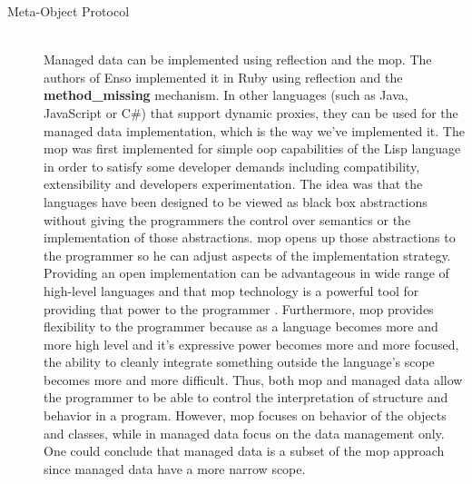 \begin{description}

  \item[Meta-Object Protocol]~\\
  Managed data can be implemented using reflection and the \ac{mop}. 
  The authors of Enso \cite{loh2012managed} implemented it in Ruby using reflection and the \textbf{method\_missing} mechanism. 
  In other languages (such as Java, JavaScript or C\#) that support dynamic proxies, they can be used for the managed data implementation, which is the way we've implemented it.
  The \ac{mop} \cite{kiczales1991art} was first implemented for simple \ac{oop} capabilities of the Lisp language in order to satisfy some developer demands including compatibility, extensibility and developers experimentation. 
  The idea was that the languages have been designed to be viewed as black box abstractions without giving the programmers the control over semantics or the implementation of those abstractions. 
  \ac{mop} opens up those abstractions to the programmer so he can adjust aspects of the implementation strategy. 
  Providing an open implementation can be advantageous in wide range of high-level languages and that \ac{mop} technology is a powerful tool for providing that power to the programmer \cite{kiczales1991art}. 
  Furthermore, \ac{mop} provides flexibility to the programmer because as a language becomes more and more high level and it's expressive power becomes more and more focused, the ability to cleanly integrate something outside the language's scope becomes more and more difficult. 
  Thus, both \ac{mop} and managed data allow the programmer to be able to control the interpretation of structure and behavior in a program.
  However, \ac{mop} focuses on behavior of the objects and classes, while in managed data focus on the data management only.
  One could conclude that managed data is a subset of the \ac{mop} approach since managed data have a more narrow scope.



\end{description}
